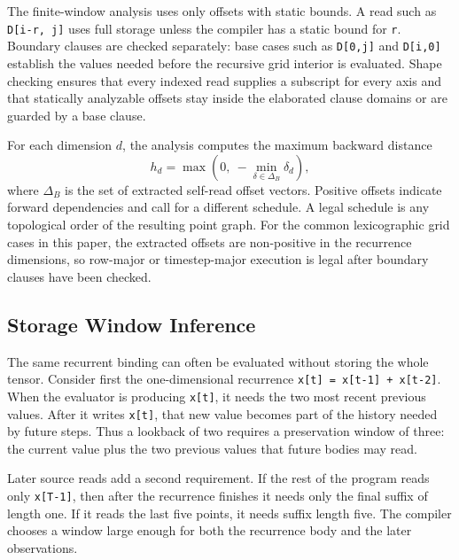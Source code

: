 \documentclass[sigplan,screen,nonacm]{acmart}
\begin{document}
The finite-window analysis uses only offsets with static bounds. A read such as \texttt{D[i-r, j]} uses full storage unless the compiler has a static bound for \texttt{r}. Boundary clauses are checked separately: base cases such as \texttt{D[0,j]} and \texttt{D[i,0]} establish the values needed before the recursive grid interior is evaluated. Shape checking ensures that every indexed read supplies a subscript for every axis and that statically analyzable offsets stay inside the elaborated clause domains or are guarded by a base clause.

For each dimension $d$, the analysis computes the maximum backward distance
\[
h_d = \max(0,\ -\min_{\delta \in \Delta_B} \delta_d),
\]
where $\Delta_B$ is the set of extracted self-read offset vectors. Positive offsets indicate forward dependencies and call for a different schedule. A legal schedule is any topological order of the resulting point graph. For the common lexicographic grid cases in this paper, the extracted offsets are non-positive in the recurrence dimensions, so row-major or timestep-major execution is legal after boundary clauses have been checked.

\subsection{Storage Window Inference}

The same recurrent binding can often be evaluated without storing the whole tensor. Consider first the one-dimensional recurrence \texttt{x[t] = x[t-1] + x[t-2]}. When the evaluator is producing \texttt{x[t]}, it needs the two most recent previous values. After it writes \texttt{x[t]}, that new value becomes part of the history needed by future steps. Thus a lookback of two requires a preservation window of three: the current value plus the two previous values that future bodies may read.

Later source reads add a second requirement. If the rest of the program reads only \texttt{x[T-1]}, then after the recurrence finishes it needs only the final suffix of length one. If it reads the last five points, it needs suffix length five. The compiler chooses a window large enough for both the recurrence body and the later observations.
\end{document}
